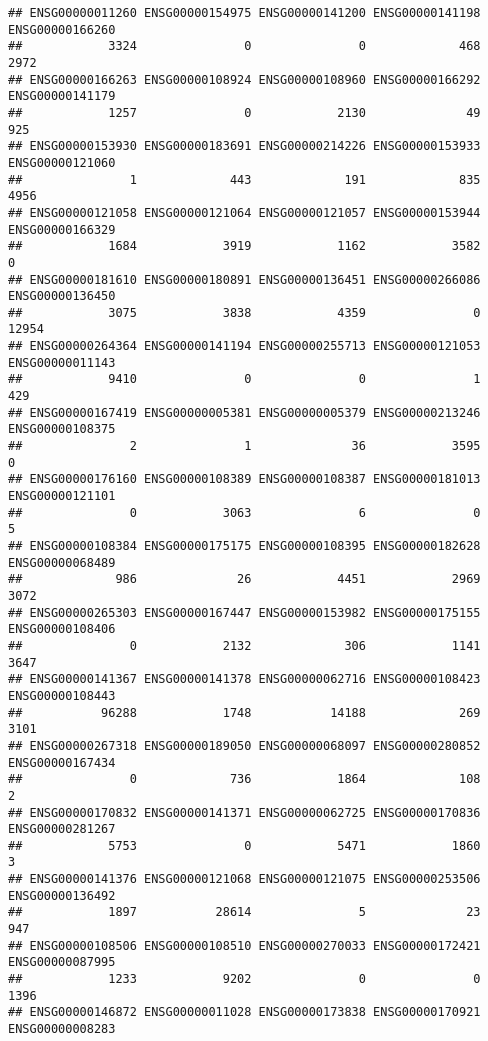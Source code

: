 \documentclass[
]{article}
\begin{document}
\begin{verbatim}
## ENSG00000011260 ENSG00000154975 ENSG00000141200 ENSG00000141198 ENSG00000166260 
##            3324               0               0             468            2972 
## ENSG00000166263 ENSG00000108924 ENSG00000108960 ENSG00000166292 ENSG00000141179 
##            1257               0            2130              49             925 
## ENSG00000153930 ENSG00000183691 ENSG00000214226 ENSG00000153933 ENSG00000121060 
##               1             443             191             835            4956 
## ENSG00000121058 ENSG00000121064 ENSG00000121057 ENSG00000153944 ENSG00000166329 
##            1684            3919            1162            3582               0 
## ENSG00000181610 ENSG00000180891 ENSG00000136451 ENSG00000266086 ENSG00000136450 
##            3075            3838            4359               0           12954 
## ENSG00000264364 ENSG00000141194 ENSG00000255713 ENSG00000121053 ENSG00000011143 
##            9410               0               0               1             429 
## ENSG00000167419 ENSG00000005381 ENSG00000005379 ENSG00000213246 ENSG00000108375 
##               2               1              36            3595               0 
## ENSG00000176160 ENSG00000108389 ENSG00000108387 ENSG00000181013 ENSG00000121101 
##               0            3063               6               0               5 
## ENSG00000108384 ENSG00000175175 ENSG00000108395 ENSG00000182628 ENSG00000068489 
##             986              26            4451            2969            3072 
## ENSG00000265303 ENSG00000167447 ENSG00000153982 ENSG00000175155 ENSG00000108406 
##               0            2132             306            1141            3647 
## ENSG00000141367 ENSG00000141378 ENSG00000062716 ENSG00000108423 ENSG00000108443 
##           96288            1748           14188             269            3101 
## ENSG00000267318 ENSG00000189050 ENSG00000068097 ENSG00000280852 ENSG00000167434 
##               0             736            1864             108               2 
## ENSG00000170832 ENSG00000141371 ENSG00000062725 ENSG00000170836 ENSG00000281267 
##            5753               0            5471            1860               3 
## ENSG00000141376 ENSG00000121068 ENSG00000121075 ENSG00000253506 ENSG00000136492 
##            1897           28614               5              23             947 
## ENSG00000108506 ENSG00000108510 ENSG00000270033 ENSG00000172421 ENSG00000087995 
##            1233            9202               0               0            1396 
## ENSG00000146872 ENSG00000011028 ENSG00000173838 ENSG00000170921 ENSG00000008283 

\end{verbatim}
\end{document}
